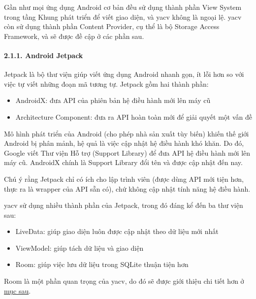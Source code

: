 Gần như mọi ứng dụng Android cơ bản đều sử dụng thành phần View System
trong tầng Khung phát triển để viết giao diện, và yacv không là ngoại
lệ. yacv còn sử dụng thành phần Content Provider, cụ thể là bộ Storage
Access Framework, và sẽ được đề cập ở các phần sau.

\hypertarget{android-jetpack}{%
  \paragraph{\texorpdfstring{2.1.1. Android Jetpack
    }{2.1.1. Android Jetpack }}\label{android-jetpack}}

Jetpack là bộ thư viện giúp viết ứng dụng Android nhanh gọn, ít lỗi hơn
so với việc tự viết những đoạn mã tương tự. Jetpack gồm hai thành phần:

\begin{itemize}
  
  \item
        AndroidX: đưa API của phiên bản hệ điều hành mới lên máy cũ
  \item
        Architecture Component: đưa ra API hoàn toàn mới để giải quyết một vấn
        đề
\end{itemize}

Mô hình phát triển của Android (cho phép nhà sản xuất tùy biến) khiến
thế giới Android bị phân mảnh, hệ quả là việc cập nhật hệ điều hành khó
khăn. Do đó, Google viết Thư viện Hỗ trợ (Support Library) để đưa API hệ
điều hành mới lên máy cũ. AndroidX chính là Support Library đổi tên và
được cập nhật đến nay.

Chú ý rằng Jetpack chỉ có ích cho lập trình viên (được dùng API mới tiện
hơn, thực ra là wrapper của API sẵn có), chứ không cập nhật tính năng hệ
điều hành.

yacv sử dụng nhiều thành phần của Jetpack, trong đó đáng kể đến ba thư
viện sau:

\begin{itemize}
  
  \item
        LiveData: giúp giao diện luôn được cập nhật theo dữ liệu mới nhất
  \item
        ViewModel: giúp tách dữ liệu và giao diện
  \item
        Room: giúp việc lưu dữ liệu trong SQLite thuận tiện hơn
\end{itemize}

Room là một phần quan trọng của yacv, do đó sẽ được giới thiệu chi tiết
hơn ở \protect\hyperlink{P2.4.2-room}{mục sau}.

